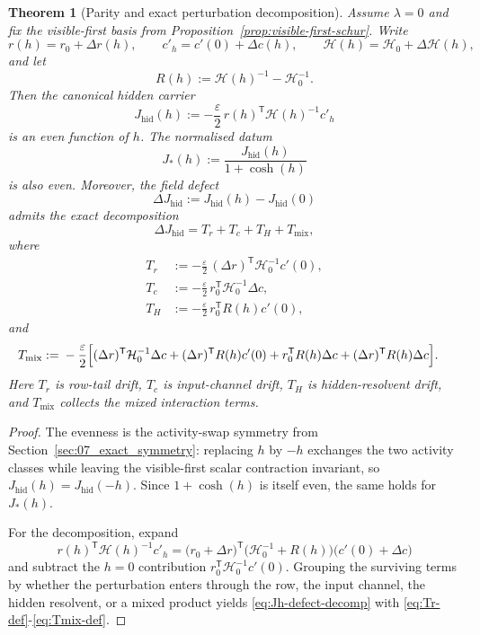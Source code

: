 \documentclass[11pt]{article}
\numberwithin{equation}{section}
\newcommand{\eps}{\varepsilon}
\theoremstyle{thmcompact}
\newtheorem{theorem}{Theorem}[section]
\theoremstyle{remark}
\begin{document}
\begin{theorem}[Parity and exact perturbation decomposition]\label{thm:field-parity-decomposition}
Assume $\lambda=0$ and fix the visible-first basis from Proposition~\ref{prop:visible-first-schur}. Write
\[
r(h)=r_0+\Delta r(h),
\qquad
c'_h=c'(0)+\Delta c(h),
\qquad
\mathcal H(h)=\mathcal H_0+\Delta\mathcal H(h),
\]
and let
\[
R(h):=\mathcal H(h)^{-1}-\mathcal H_0^{-1}.
\]
Then the canonical hidden carrier
\[
J_{\mathrm{hid}}(h):=-\frac{\eps}{2}\,r(h)^{\mathsf T}\mathcal H(h)^{-1}c'_h
\]
is an even function of $h$. The normalised datum
\begin{equation}\label{eq:Jstar-def}
J_*(h):=\frac{J_{\mathrm{hid}}(h)}{1+\cosh(h)}
\end{equation}
is also even. Moreover, the field defect
\[
\Delta J_{\mathrm{hid}}:=J_{\mathrm{hid}}(h)-J_{\mathrm{hid}}(0)
\]
admits the exact decomposition
\begin{equation}\label{eq:Jh-defect-decomp}
\Delta J_{\mathrm{hid}}=T_r+T_c+T_H+T_{\mathrm{mix}},
\end{equation}
where
\begin{align}
T_r&:=-\frac{\eps}{2}\,(\Delta r)^{\mathsf T}\mathcal H_0^{-1}c'(0),\label{eq:Tr-def}\\
T_c&:=-\frac{\eps}{2}\,r_0^{\mathsf T}\mathcal H_0^{-1}\Delta c,\label{eq:Tc-def}\\
T_H&:=-\frac{\eps}{2}\,r_0^{\mathsf T}R(h)c'(0),\label{eq:TH-def}
\end{align}
and
\begin{align}\label{eq:Tmix-def}
T_{\mathrm{mix}}:={}&-\frac{\eps}{2}\Bigl[(\Delta r)^{\mathsf T}\mathcal H_0^{-1}\Delta c
+(\Delta r)^{\mathsf T}R(h)c'(0)
+r_0^{\mathsf T}R(h)\Delta c
+(\Delta r)^{\mathsf T}R(h)\Delta c\Bigr].
\end{align}
Here $T_r$ is row-tail drift, $T_c$ is input-channel drift, $T_H$ is hidden-resolvent drift, and $T_{\mathrm{mix}}$ collects the mixed interaction terms.
\end{theorem}

\begin{proof}
The evenness is the activity-swap symmetry from Section~\ref{sec:07_exact_symmetry}: replacing $h$ by $-h$ exchanges the two activity classes while leaving the visible-first scalar contraction invariant, so $J_{\mathrm{hid}}(h)=J_{\mathrm{hid}}(-h)$. Since $1+\cosh(h)$ is itself even, the same holds for $J_*(h)$.

For the decomposition, expand
\[
r(h)^{\mathsf T}\mathcal H(h)^{-1}c'_h
=
\bigl(r_0+\Delta r\bigr)^{\mathsf T}\bigl(\mathcal H_0^{-1}+R(h)\bigr)\bigl(c'(0)+\Delta c\bigr)
\]
and subtract the $h=0$ contribution $r_0^{\mathsf T}\mathcal H_0^{-1}c'(0)$. Grouping the surviving terms by whether the perturbation enters through the row, the input channel, the hidden resolvent, or a mixed product yields \eqref{eq:Jh-defect-decomp} with \eqref{eq:Tr-def}-\eqref{eq:Tmix-def}.
\end{proof}
\end{document}
